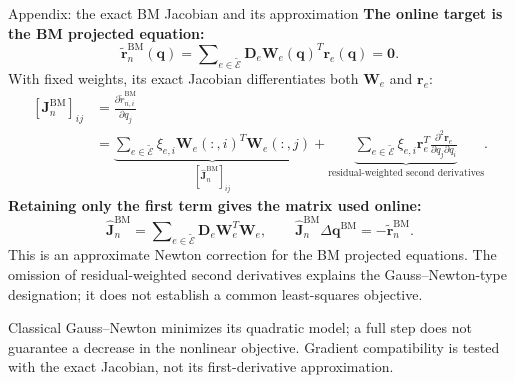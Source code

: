 \documentclass[aspectratio=169]{beamer}
\newcommand{\vect}[1]{\boldsymbol{#1}}
\newcommand{\matr}[1]{\boldsymbol{#1}}
\begin{document}
\begin{frame}{Appendix: the exact BM Jacobian and its approximation}
\hypertarget{bmecsw-bm-jacobian-approximation}{}
\fontsize{9.5}{11}\selectfont
\setlength{\parskip}{0pt}
\setlength{\abovedisplayskip}{2pt}
\setlength{\belowdisplayskip}{2pt}
\setlength{\abovedisplayshortskip}{2pt}
\setlength{\belowdisplayshortskip}{2pt}
\textbf{The online target is the BM projected equation:}
\[
  \widetilde{\vect{r}}_n^{\mathrm{BM}}(\vect{q})
  =\sum\nolimits_{e\in\widetilde{\mathcal E}}\matr{D}_e\matr{W}_e(\vect{q})^T\vect{r}_e(\vect{q})
  =\vect{0}.
\]
With fixed weights, its exact Jacobian differentiates both $\matr{W}_e$ and $\vect{r}_e$:
\[
\begin{aligned}
  \left[\matr{J}_n^{\mathrm{BM}}\right]_{ij}
  &=\frac{\partial\widetilde r_{n,i}^{\mathrm{BM}}}{\partial q_j}\\
  &=\underbrace{\sum\nolimits_{e\in\widetilde{\mathcal E}}\xi_{e,i}
      \matr{W}_e(:,i)^T\matr{W}_e(:,j)}_{
      [\widehat{\matr{J}}_n^{\mathrm{BM}}]_{ij}}
   +\underbrace{\sum\nolimits_{e\in\widetilde{\mathcal E}}\xi_{e,i}
      \vect{r}_e^T\frac{\partial^2\vect{r}_e}{\partial q_j\partial q_i}}_{
      \text{residual-weighted second derivatives}}.
\end{aligned}
\]
\textbf{Retaining only the first term gives the matrix used online:}
\[
  \widehat{\matr{J}}_n^{\mathrm{BM}}
  =\sum\nolimits_{e\in\widetilde{\mathcal E}}\matr{D}_e\matr{W}_e^T\matr{W}_e,
  \qquad
  \widehat{\matr{J}}_n^{\mathrm{BM}}\Delta\vect{q}^{\mathrm{BM}}
  =-\widetilde{\vect{r}}_n^{\mathrm{BM}}.
\]
This is an approximate Newton correction for the BM projected equations. The omission of residual-weighted second derivatives explains the Gauss--Newton-type designation; it does not establish a common least-squares objective.\par
\vspace{0pt}
{\fontsize{8}{9}\selectfont Classical Gauss--Newton minimizes its quadratic model; a full step does not guarantee a decrease in the nonlinear objective. Gradient compatibility is tested with the exact Jacobian, not its first-derivative approximation.}
\vfill\hfill\hyperlink{bmecsw-online-interpretation}{}
\end{frame}
\end{document}
